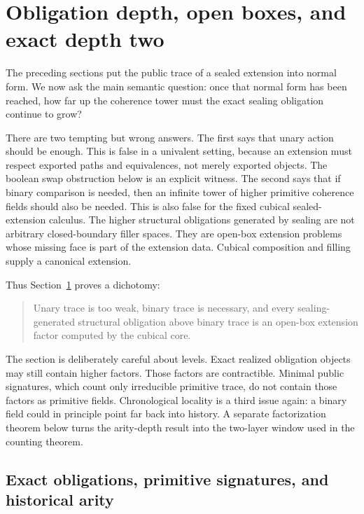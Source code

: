\section{Obligation depth, open boxes, and exact depth two}
\label{sec:depth-two}

The preceding sections put the public trace of a sealed extension into normal form.  We now
ask the main semantic question: once that normal form has been reached, how far up the
coherence tower must the exact sealing obligation continue to grow?

There are two tempting but wrong answers.  The first says that unary action should be
enough.  This is false in a univalent setting, because an extension must respect exported
paths and equivalences, not merely exported objects.  The boolean swap obstruction below is
an explicit witness.  The second says that if binary comparison is needed, then an infinite
tower of higher primitive coherence fields should also be needed.  This is also false for the
fixed cubical sealed-extension calculus.  The higher structural obligations generated by
sealing are not arbitrary closed-boundary filler spaces.  They are open-box extension
problems whose missing face is part of the extension data.  Cubical composition and filling
supply a canonical extension.

Thus Section~\ref{sec:depth-two} proves a dichotomy:
\begin{quote}
Unary trace is too weak, binary trace is necessary, and every sealing-generated structural
obligation above binary trace is an open-box extension factor computed by the cubical core.
\end{quote}

The section is deliberately careful about levels.  Exact realized obligation objects may
still contain higher factors.  Those factors are contractible.  Minimal public signatures,
which count only irreducible primitive trace, do not contain those factors as primitive
fields.  Chronological locality is a third issue again: a binary field could in principle point
far back into history.  A separate factorization theorem below turns the arity-depth result
into the two-layer window used in the counting theorem.

\subsection{Exact obligations, primitive signatures, and historical arity}
\label{subsec:obligation-objects}

